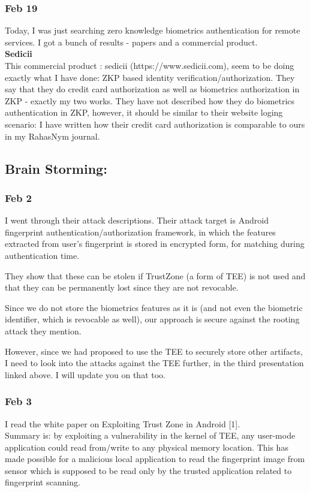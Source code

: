 \documentclass[11pt]{article}
\begin{document}
\subsubsection*{Feb 19}
Today, I was just searching zero knowledge biometrics authentication for remote services. I got a bunch of results - papers and a commercial
product.\\
\textbf{Sedicii}\\
This commercial product : sedicii (https://www.sedicii.com), seem to be doing exactly what I have done: ZKP based identity verification/authorization.
They say that they do credit card authorization as well as biometrics authorization in ZKP - exactly my two works.
They have not described how they do biometrics authentication in ZKP, however, it should be similar to their website loging scenario:
I have written how their credit card authorization is comparable to ours in my RahasNym journal.
\pagebreak

\subsection*{Brain Storming:}

\subsubsection*{Feb 2}
I went through their attack descriptions. Their attack target is Android fingerprint authentication/authorization framework, in which the features 
extracted from user's fingerprint is stored in encrypted form, for matching during authentication time. 

They show that these can be stolen if TrustZone (a form of TEE) is not used and that they can be permanently lost since they are not revocable.

Since we do not store the biometrics features as it is (and not even the biometric identifier, which is revocable as well), our approach is secure 
against the rooting attack they mention.

However, since we had proposed to use the TEE to securely store other artifacts, I need to look into the attacks against the TEE further, in the third 
presentation linked above. I will update you on that too.

\subsubsection*{Feb 3}
I read the white paper on Exploiting Trust Zone in Android [1].\\
Summary is: by exploiting a vulnerability in the kernel of TEE, any user-mode application could read from/write to any physical memory location. This 
has made possible for a malicious local application to read the fingerprint image from sensor which is supposed to be read only by the trusted 
application related to fingerprint scanning.
\end{document}
